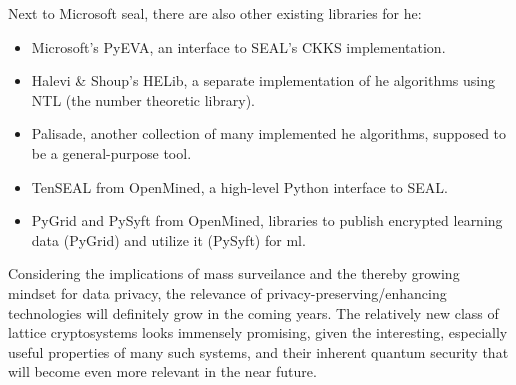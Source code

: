 Next to Microsoft \gls{seal}, there are also other existing libraries for \gls{he}:
\begin{itemize}
  \item Microsoft's PyEVA, an interface to SEAL's CKKS implementation.
  \item Halevi \& Shoup's HELib, a separate implementation of \gls{he} algorithms using NTL (the number theoretic library).
  \item Palisade, another collection of many implemented \gls{he} algorithms, supposed to be a general-purpose tool.
  \item TenSEAL from OpenMined, a high-level Python interface to SEAL.
  \item PyGrid and PySyft from OpenMined, libraries to publish encrypted learning data (PyGrid) and utilize it (PySyft) for \gls{ml}.
\end{itemize}

Considering the implications of mass surveilance and the thereby growing mindset for data privacy, the relevance of privacy-preserving/enhancing technologies will definitely grow in the coming years.
The relatively new class of lattice cryptosystems looks immensely promising, given the interesting, especially useful properties of many such systems, and their inherent quantum security that will become even more relevant in the near future.
